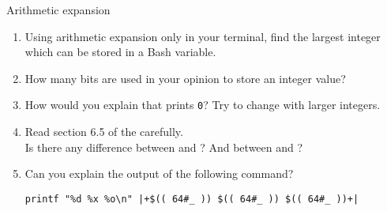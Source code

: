 
\begin{exercise}[Technical]{Arithmetic expansion}
    \vspace{-5mm}
    \begin{enumerate}
        \item Using arithmetic expansion only in your terminal, find the largest integer which can be stored in a Bash variable.
        \item How many bits are used in your opinion to store an integer value?
        \item How would you explain that  prints \texttt{0}? Try to change  with larger integers.
        \item Read section 6.5 of the  carefully.\\
              Is there any difference between \mbox{} and \mbox{}?
              And between \mbox{} and \mbox{}?
        \item Can you explain the output of the following command?
              \begin{lstlisting}[style=MyBash]
                  printf "%d %x %o\n" |+$(( 64#_ )) $(( 64#_ )) $(( 64#_ ))+|
              \end{lstlisting}
    \end{enumerate}
    \vspace{-0mm}
\end{exercise}
